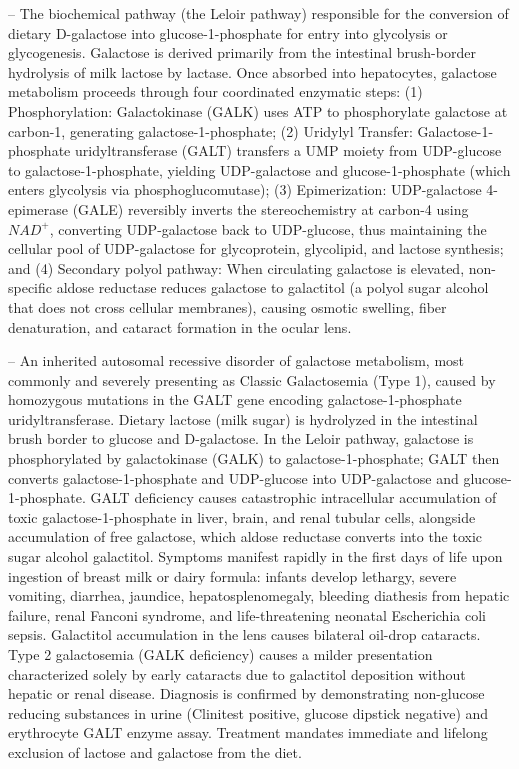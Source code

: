 -- The biochemical pathway (the Leloir pathway) responsible for the conversion of dietary D-galactose into glucose-1-phosphate for entry into glycolysis or glycogenesis. Galactose is derived primarily from the intestinal brush-border hydrolysis of milk lactose by lactase. Once absorbed into hepatocytes, galactose metabolism proceeds through four coordinated enzymatic steps: (1) Phosphorylation: Galactokinase (GALK) uses ATP to phosphorylate galactose at carbon-1, generating galactose-1-phosphate; (2) Uridylyl Transfer: Galactose-1-phosphate uridyltransferase (GALT) transfers a UMP moiety from UDP-glucose to galactose-1-phosphate, yielding UDP-galactose and glucose-1-phosphate (which enters glycolysis via phosphoglucomutase); (3) Epimerization: UDP-galactose 4-epimerase (GALE) reversibly inverts the stereochemistry at carbon-4 using $NAD^+$, converting UDP-galactose back to UDP-glucose, thus maintaining the cellular pool of UDP-galactose for glycoprotein, glycolipid, and lactose synthesis; and (4) Secondary polyol pathway: When circulating galactose is elevated, non-specific aldose reductase reduces galactose to galactitol (a polyol sugar alcohol that does not cross cellular membranes), causing osmotic swelling, fiber denaturation, and cataract formation in the ocular lens.

-- An inherited autosomal recessive disorder of galactose metabolism, most commonly and severely presenting as Classic Galactosemia (Type 1), caused by homozygous mutations in the GALT gene encoding galactose-1-phosphate uridyltransferase. Dietary lactose (milk sugar) is hydrolyzed in the intestinal brush border to glucose and D-galactose. In the Leloir pathway, galactose is phosphorylated by galactokinase (GALK) to galactose-1-phosphate; GALT then converts galactose-1-phosphate and UDP-glucose into UDP-galactose and glucose-1-phosphate. GALT deficiency causes catastrophic intracellular accumulation of toxic galactose-1-phosphate in liver, brain, and renal tubular cells, alongside accumulation of free galactose, which aldose reductase converts into the toxic sugar alcohol galactitol. Symptoms manifest rapidly in the first days of life upon ingestion of breast milk or dairy formula: infants develop lethargy, severe vomiting, diarrhea, jaundice, hepatosplenomegaly, bleeding diathesis from hepatic failure, renal Fanconi syndrome, and life-threatening neonatal Escherichia coli sepsis. Galactitol accumulation in the lens causes bilateral oil-drop cataracts. Type 2 galactosemia (GALK deficiency) causes a milder presentation characterized solely by early cataracts due to galactitol deposition without hepatic or renal disease. Diagnosis is confirmed by demonstrating non-glucose reducing substances in urine (Clinitest positive, glucose dipstick negative) and erythrocyte GALT enzyme assay. Treatment mandates immediate and lifelong exclusion of lactose and galactose from the diet.

